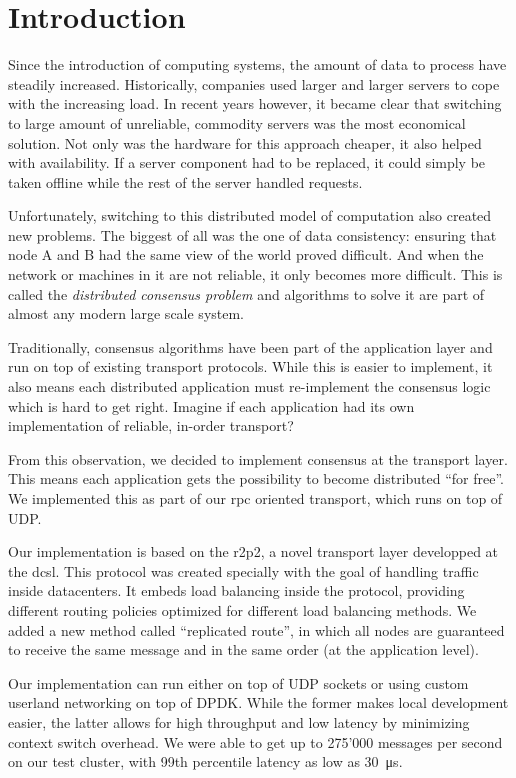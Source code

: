 \chapter{Introduction}

Since the introduction of computing systems, the amount of data to process have steadily increased.
Historically, companies used larger and larger servers to cope with the increasing load.
In recent years however, it became clear that switching to large amount of unreliable, commodity servers was the most economical solution.
Not only was the hardware for this approach cheaper, it also helped with availability.
If a server component had to be replaced, it could simply be taken offline while the rest of the server handled requests.

Unfortunately, switching to this distributed model of computation also created new problems.
The biggest of all was the one of data consistency: ensuring that node A and B had the same view of the world proved difficult.
And when the network or machines in it are not reliable, it only becomes more difficult.
This is called the \emph{distributed consensus problem} and algorithms to solve it are part of almost any modern large scale system.

Traditionally, consensus algorithms have been part of the application layer and run on top of existing transport protocols.
While this is easier to implement, it also means each distributed application must re-implement the consensus logic which is hard to get right.
Imagine if each application had its own implementation of reliable, in-order transport?

From this observation, we decided to implement consensus at the transport layer.
This means each application gets the possibility to become distributed ``for free''.
We implemented this as part of our \gls{rpc} oriented transport, which runs on top of UDP.

Our implementation is based on the \gls{r2p2}, a novel transport layer developped at the \gls{dcsl}.
This protocol was created specially with the goal of handling traffic inside datacenters.
It embeds load balancing inside the protocol, providing different routing policies optimized for different load balancing methods.
We added a new method called ``replicated route'', in which all nodes are guaranteed to receive the same message and in the same order (at the application level).

Our implementation can run either on top of UDP sockets or using custom userland networking on top of DPDK.
While the former makes local development easier, the latter allows for high throughput and low latency by minimizing context switch overhead.
We were able to get up to 275'000 messages per second on our test cluster, with 99th percentile latency as low as \SI{30}{\micro\second}.


